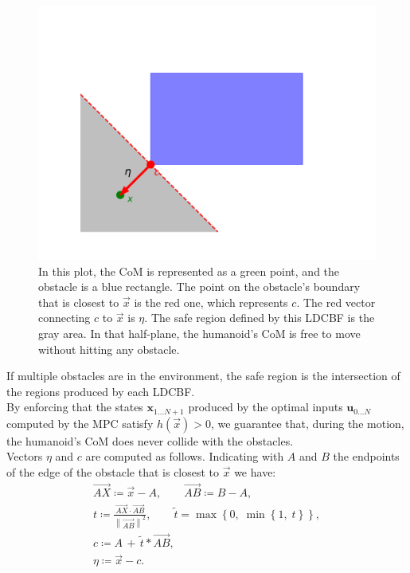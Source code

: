 \documentclass[main.tex]{subfiles}
\begin{document}
\begin{figure}[h]
    \centering
    \includegraphics[width=0.75\linewidth]{figures//MPC/example_lcbf.pdf}
    \caption{In this plot, the CoM is represented as a green point, and the obstacle is a blue rectangle. The point on the obstacle's boundary that is closest to $\vec{x}$ is the red one, which represents $c$. The red vector connecting $c$ to $\vec{x}$ is $\eta$. The safe region defined by this LDCBF is the gray area. In that half-plane, the humanoid's CoM is free to move without hitting any obstacle.}
    \label{fig:example_LDCBF}
\end{figure}

If multiple obstacles are in the environment, the safe region is the intersection of the regions produced by each LDCBF.\\
By enforcing that the states $\mathbf{x}_{1...N+1}$ produced by the optimal inputs $\mathbf{u}_{0...N}$ computed by the MPC satisfy $h(\vec{x})>0$, we guarantee that, during the motion, the humanoid's CoM does never collide with the obstacles.\\

Vectors $\eta$ and $c$ are computed as follows. Indicating with $A$ and $B$ the endpoints of the edge of the obstacle that is closest to $\vec{x}$ we have:
\begin{gather*}
    \overrightarrow{AX} \coloneqq \vec{x} - A, \qquad \overrightarrow{AB} \coloneqq B - A, \\
    t \coloneqq \frac{\overrightarrow{AX} \cdot \overrightarrow{AB}}{\left\lVert \overrightarrow{AB} \right\rVert ^2}, \qquad \tilde{t} = \max \left\{0,\; \min \left\{ 1,\; t\right\}\right\}, \\
    c \coloneqq A\, +\, \tilde{t}*\overrightarrow{AB}, \\
    \eta \coloneqq \vec{x} - c.
\end{gather*}
\end{document}

